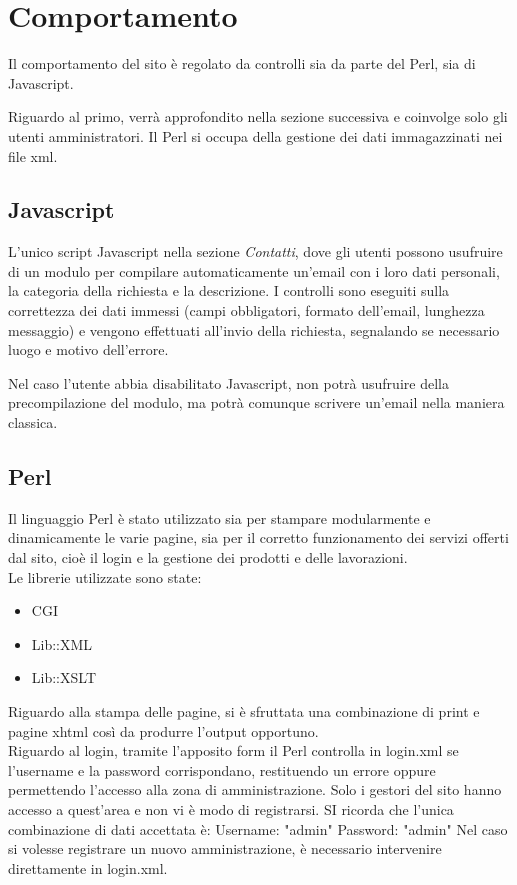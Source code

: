 \documentclass[11pt]{article}
\begin{document}
\newpage
\section{Comportamento}
Il comportamento del sito è regolato da controlli sia da parte del Perl, sia di Javascript.

Riguardo al primo, verrà approfondito nella sezione successiva e coinvolge solo gli utenti amministratori. Il Perl si occupa della gestione dei dati immagazzinati nei file xml.

\subsection{Javascript}

L'unico script Javascript nella sezione \textit{Contatti}, dove gli utenti possono usufruire di un modulo per compilare automaticamente un'email con i loro dati personali, la categoria della richiesta e la descrizione. I controlli sono eseguiti sulla correttezza dei dati immessi (campi obbligatori, formato dell'email, lunghezza messaggio) e vengono effettuati all'invio della richiesta, segnalando se necessario luogo e motivo dell'errore.

Nel caso l'utente abbia disabilitato Javascript, non potrà usufruire della precompilazione del modulo, ma potrà comunque scrivere un'email nella maniera classica.

\subsection{Perl}

Il linguaggio Perl è stato utilizzato sia per stampare modularmente e dinamicamente le varie pagine, sia per il corretto funzionamento dei servizi offerti dal sito, cioè il login e la gestione dei prodotti e delle lavorazioni.
\\Le librerie utilizzate sono state:

\begin{itemize}
	\item CGI
	\item Lib::XML
	\item Lib::XSLT
\end{itemize}

Riguardo alla stampa delle pagine, si è sfruttata una combinazione di print e pagine xhtml così da produrre l'output opportuno.
\\Riguardo al login, tramite l'apposito form il Perl controlla in login.xml se l'username e la password corrispondano, restituendo un errore oppure permettendo l'accesso alla zona di amministrazione. Solo i gestori del sito hanno accesso a quest'area e non vi è modo di registrarsi. 
SI ricorda che l'unica combinazione di dati accettata è:
Username: "admin"
Password: "admin"
Nel caso si volesse registrare un nuovo amministrazione, è necessario intervenire direttamente in login.xml.
\end{document}
